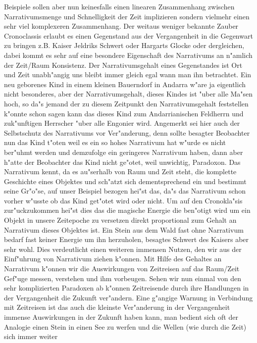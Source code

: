 \documentclass[a5paper,8pt]{book}
\begin{document}
Beispiele sollen aber nun keinesfalls einen linearen Zusammenhang zwischen Narrativumsmenge und Schnelligkeit der Zeit implizieren sondern 
vielmehr einen sehr viel komplexeren Zusammenhang.
Der weitaus weniger bekannte Zauber Cronoclassis erlaubt es einen Gegenstand aus der Vergangenheit in die Gegenwart zu bringen z.B. Kaiser 
Jeldriks Schwert oder Hargarts Glocke oder dergleichen, dabei kommt es sehr auf eine besondere Eigenschaft des Narrativums an n"amlich der 
Zeit/Raum Konsistenz. Der Narrativumsgehalt eines Gegenstandes ist Ort und Zeit unabh"angig uns bleibt immer gleich egal wann man ihn 
betrachtet. Ein neu geborenes Kind in einem kleinen Bauerndorf in Andarra w"are ja eigentlich nicht besonderes, aber der Narrativumsgehalt, 
dieses Kindes ist "uber alle Ma"sen hoch, so da"s jemand der zu diesem Zeitpunkt den Narrativumsgehalt feststellen k"onnte schon sagen kann 
das dieses Kind zum Andarrianischen Feldherrn und zuk"unftigen Herrscher "uber alle Engonier wird. Angemerkt sei hier auch der Selbstschutz 
des Narrativums vor Ver"anderung, denn sollte besagter Beobachter nun das Kind t"oten weil es ein so hohes Narrativum hat w"urde es nicht 
ber"uhmt werden und demzufolge ein geringeres 
Narrativum haben, dann aber h"atte der Beobachter das Kind nicht ge"otet, weil unwichtig, Paradoxon. Das Narrativum kennt, da es au"serhalb 
von Raum und Zeit steht, die komplette Geschichte eines Objektes und sch"atzt sich dementsprechend ein und bestimmt seine Gr"o"se, auf unser 
Beispiel bezogen hei"st das, da"s das Narrativum schon vorher w"usste ob das Kind get"otet wird oder nicht.
Um auf den Cronokla"sis zur"uckzukommen hei"st dies das die magische Energie die ben"otigt wird um ein Objekt in unsere Zeitepoche zu versetzen 
direkt proportional zum Gehalt an Narrativum dieses Objektes ist. Ein Stein aus dem Wald fast ohne Narrativum bedarf fast keiner Energie 
um ihn herzuholen, besagtes Schwert des Kaisers aber sehr wohl.
Dies verdeutlicht einen weiteren immensen Nutzen, den wir aus der Einf"uhrung von Narrativum ziehen k"onnen. Mit Hilfe des Gehaltes an 
Narrativum k"onnen wir die Auswirkungen von Zeitreisen auf das Raum/Zeit Gef"uge messen, verstehen und ihm vorbeugen. Sehen wir nun einmal 
von den sehr komplizierten Paradoxen ab k"onnen Zeitreisende durch ihre Handlungen in der Vergangenheit die Zukunft ver"andern. Eine 
g"angige Warnung in Verbindung mit Zeitreisen ist das auch die kleinste Ver"anderung in der Vergangenheit immense Auswirkungen in der Zukunft 
haben kann, man bedient sich oft der Analogie einen Stein in einen See zu werfen und die Wellen (wie durch die Zeit) sich immer weiter 
\end{document}
